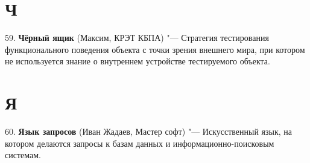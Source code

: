 \documentclass[14 pt]{extarticle}
\begin{document}
\section*{Ч}
    59. \textbf{Чёрный ящик} (Максим, КРЭТ КБПА) "--- Стратегия тестирования функционального поведения объекта с точки зрения внешнего мира, при котором не используется знание о внутреннем устройстве тестируемого объекта. \\
    
\section*{Я}
    60. \textbf{Язык запросов} (Иван Жадаев, Мастер софт) "--- Искусственный язык, на котором делаются запросы к базам данных и информационно-поисковым системам. \\
    
\end{document}
